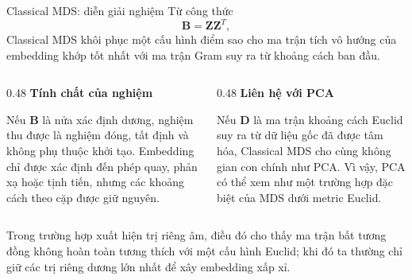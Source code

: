 \begin{frame}[shrink=5]{Classical MDS: diễn giải nghiệm}
    \small
    Từ công thức
    \[
        \mathbf{B}=\mathbf{Z}\mathbf{Z}^T,
    \]
    Classical MDS khôi phục một cấu hình điểm sao cho ma trận tích vô hướng của embedding khớp tốt nhất với ma trận Gram suy ra từ khoảng cách ban đầu.

    \vspace{0.14cm}
    \begin{columns}[T,onlytextwidth]
        \begin{column}{0.48\textwidth}
            {\bfseries Tính chất của nghiệm}

            Nếu $\mathbf{B}$ là nửa xác định dương, nghiệm thu được là nghiệm đóng, tất định và không phụ thuộc khởi tạo. Embedding chỉ được xác định đến phép quay, phản xạ hoặc tịnh tiến, nhưng các khoảng cách theo cặp được giữ nguyên.
        \end{column}
        \begin{column}{0.48\textwidth}
            {\bfseries Liên hệ với PCA}

            Nếu $\mathbf{D}$ là ma trận khoảng cách Euclid suy ra từ dữ liệu gốc đã được tâm hóa, Classical MDS cho cùng không gian con chính như PCA. Vì vậy, PCA có thể xem như một trường hợp đặc biệt của MDS dưới metric Euclid.
        \end{column}
    \end{columns}

    \vspace{0.12cm}
    Trong trường hợp xuất hiện trị riêng âm, điều đó cho thấy ma trận bất tương đồng không hoàn toàn tương thích với một cấu hình Euclid; khi đó ta thường chỉ giữ các trị riêng dương lớn nhất để xây embedding xấp xỉ.

    \hfill{\scriptsize \cite{duchesnay2021statsml}}
\end{frame}

